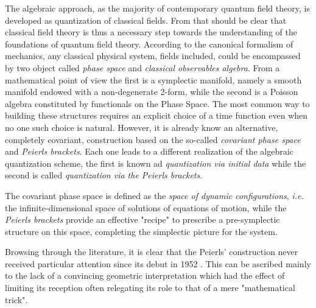 \documentclass[Main]{subfiles}
\begin{document}
The algebraic approach, as the majority of contemporary quantum field theory, is developed as quantization of classical fields.
From that should be clear that classical field theory  is thus a necessary step towards the understanding of the foundations of  quantum field theory.
	According to the canonical formalism of mechanics, any  classical physical system, fields included, could be encompassed by two object  called \emph{phase space} and \emph{classical observables algebra}. 
	From a mathematical point of view  the first is a symplectic manifold, namely a smooth manifold endowed with a non-degenerate 2-form, while the second is a Poisson algebra constituted by functionals on the Phase Space.
	The most common way to building these structures requires an explicit choice of a time function even when no one such choice is natural. 
	However, it is already know an alternative, completely covariant, construction based on the so-called \emph{covariant phase space} and \emph{Peierls brackets}.
	Each one leads to a different realization of the algebraic quantization scheme, the first is known ad \emph{quantization via initial data} while the second is called \emph{quantization via the Peierls brackets}.
	
The covariant phase space is defined as the \emph{space of dynamic configurations}, \textit{i.e.}  the infinite-dimensional space of solutions of equations of motion, while the \emph{Peierls brackets} provide an effective "recipe" to prescribe a pre-symplectic structure on this space, completing the simplectic picture for the system.

Browsing through the literature, it is clear that the Peierls' construction never received particular attention since its debut in 1952 \cite{Peierls1952}.
This can be ascribed mainly to the lack of a convincing geometric interpretation
which had the effect of limiting its reception often relegating its role to that of a mere  "mathematical trick".
\end{document}
